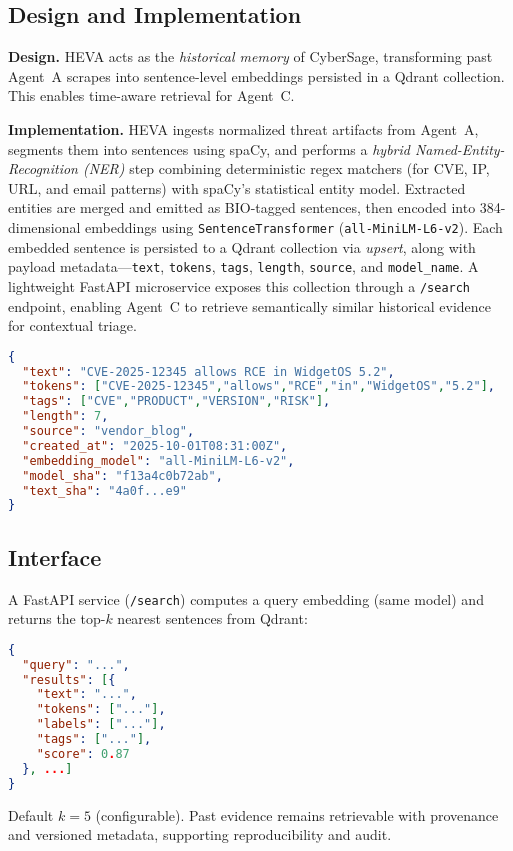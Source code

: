 \subsection{Design and Implementation}
\textbf{Design.}
HEVA acts as the \emph{historical memory} of CyberSage, transforming past Agent~A scrapes into sentence-level embeddings persisted in a Qdrant collection. This enables time-aware retrieval for Agent~C.

\textbf{Implementation.}
HEVA ingests normalized threat artifacts from Agent~A, segments them into sentences using spaCy, and performs a \emph{hybrid Named-Entity-Recognition (NER)} step combining deterministic regex matchers (for CVE, IP, URL, and email patterns) with spaCy’s statistical entity model.  
Extracted entities are merged and emitted as BIO-tagged sentences, then encoded into 384-dimensional embeddings using \texttt{SentenceTransformer} (\texttt{all-MiniLM-L6-v2}).  
Each embedded sentence is persisted to a Qdrant collection via \emph{upsert}, along with payload metadata—\texttt{text}, \texttt{tokens}, \texttt{tags}, \texttt{length}, \texttt{source}, and \texttt{model\_name}.  
A lightweight FastAPI microservice exposes this collection through a \texttt{/search} endpoint, enabling Agent~C to retrieve semantically similar historical evidence for contextual triage.

\begin{lstlisting}[language=json,caption={Qdrant Payload Schema for HEVA (Per Sentence)},label={lst:agentB-payload}]
{
  "text": "CVE-2025-12345 allows RCE in WidgetOS 5.2",
  "tokens": ["CVE-2025-12345","allows","RCE","in","WidgetOS","5.2"],
  "tags": ["CVE","PRODUCT","VERSION","RISK"],
  "length": 7,
  "source": "vendor_blog",
  "created_at": "2025-10-01T08:31:00Z",
  "embedding_model": "all-MiniLM-L6-v2",
  "model_sha": "f13a4c0b72ab",
  "text_sha": "4a0f...e9"
}
\end{lstlisting}

\subsection{Interface}
A FastAPI service (\texttt{/search}) computes a query embedding (same model) and returns the top-$k$ nearest sentences from Qdrant:
\begin{lstlisting}[language=json,caption={/search Response Schema}]
{
  "query": "...",
  "results": [{
    "text": "...",
    "tokens": ["..."],
    "labels": ["..."],
    "tags": ["..."],
    "score": 0.87
  }, ...]
}
\end{lstlisting}
Default $k=5$ (configurable). 
Past evidence remains retrievable with provenance and versioned metadata, supporting reproducibility and audit.

